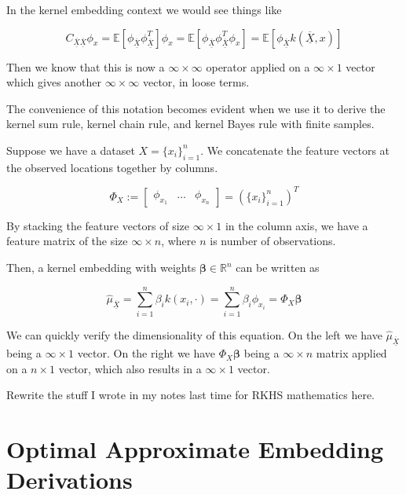 \documentclass[twoside]{article} \usepackage{aistats2017}
\newcommand{\rv}[1]{\underline{\overline{#1}}}
\newcommand{\warn}[1]{{\color{red} #1}}
\begin{document}
	In the kernel embedding context we would see things like
	
		\begin{equation}
			C_{\rv{X} \rv{X}} \phi_{x} = \mathbb{E}[\phi_{\rv{X}} \phi_{\rv{X}}^{T}] \phi_{x} = \mathbb{E}[\phi_{\rv{X}} \phi_{\rv{X}}^{T} \phi_{x}] = \mathbb{E}[\phi_{\rv{X}} k(\rv{X}, x)]
		\end{equation}
			
	Then we know that this is now a $\infty \times \infty$ operator applied on a $\infty \times 1$ vector which gives another $\infty \times \infty$ vector, in loose terms.
	
	The convenience of this notation becomes evident when we use it to derive the kernel sum rule, kernel chain rule, and kernel Bayes rule with finite samples.
	
	Suppose we have a dataset $X = \{x_{i}\}_{i = 1}^{n}$. We concatenate the feature vectors at the observed locations together by columns.
	
	\begin{equation}
		\Phi_{X} := \begin{bmatrix} \phi_{x_{1}} & \dots & \phi_{x_{n}} \end{bmatrix} = (\{x_{i}\}_{i = 1}^{n})^{T}
	\end{equation}
	
	By stacking the feature vectors of size $\infty \times 1$ in the column axis, we have a feature matrix of the size $\infty \times n$, where $n$ is number of observations.
	
	Then, a kernel embedding with weights $\bm{\beta} \in \mathbb{R}^{n}$ can be written as
	
	\begin{equation}
		\hat{\mu}_{\rv{X}} = \sum_{i = 1}^{n} \beta_{i} k(x_{i}, \cdot) = \sum_{i = 1}^{n} \beta_{i} \phi_{x_{i}} = \Phi_{X} \bm{\beta}
	\end{equation}
	
	We can quickly verify the dimensionality of this equation. On the left we have  $\hat{\mu}_{\rv{X}}$ being a $\infty \times 1$ vector. On the right we have $\Phi_{X} \bm{\beta}$ being a $\infty \times n$ matrix applied on a $n \times 1$ vector, which also results in a $\infty \times 1$ vector.
	
	\warn{Rewrite the stuff I wrote in my notes last time for RKHS mathematics here.}
	
\section{Optimal Approximate Embedding Derivations}
\end{document}
